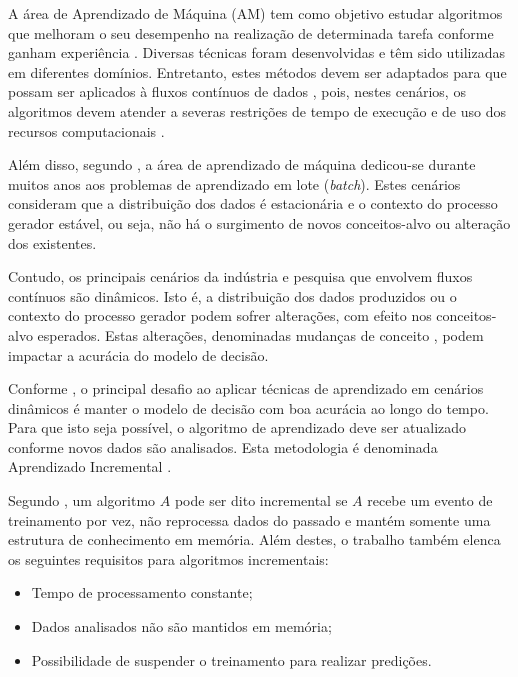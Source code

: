 \documentclass[qual, classic, a4paper]{ufbathesis}
\begin{document}
A área de Aprendizado de Máquina (AM) tem como objetivo estudar algoritmos que melhoram o seu desempenho na realização de determinada tarefa conforme ganham experiência \cite{Mitchell:1997:ML:541177}.
Diversas técnicas foram desenvolvidas e têm sido utilizadas em diferentes domínios.
Entretanto, estes métodos devem ser adaptados para que possam ser aplicados à fluxos contínuos de dados \cite{Aggarwal:2006:DSM:1196418},
pois, nestes cenários, os algoritmos devem atender a severas restrições de tempo de execução e de uso dos recursos computacionais \cite{Bifet:2009:ALM:1656274.1656287}.

Além disso, segundo \cite{Gama:2010:KDD:1855075}, a área de aprendizado de máquina dedicou-se durante muitos anos aos problemas de aprendizado em lote (\textit{batch}).
Estes cenários consideram que a distribuição dos dados é estacionária e o contexto do processo gerador estável, 
ou seja, 
não há o surgimento de novos conceitos-alvo ou alteração dos existentes.

Contudo, os principais cenários da indústria e pesquisa que envolvem fluxos contínuos são dinâmicos.
Isto é, a distribuição dos dados produzidos ou o contexto do processo gerador podem sofrer alterações, com efeito nos conceitos-alvo esperados.
Estas alterações, denominadas mudanças de conceito \cite{Gama:2010:KDD:1855075}, podem impactar a acurácia do modelo de decisão.

Conforme \cite{Gama:Rodrigues:2009}, o principal desafio ao aplicar técnicas de aprendizado em cenários dinâmicos é manter o modelo de decisão com boa acurácia ao longo do tempo.
Para que isto seja possível, o algoritmo de aprendizado deve ser atualizado conforme novos dados são analisados.
Esta metodologia é denominada Aprendizado Incremental \cite{Gama:2014:SCD:2597757.2523813}.

Segundo \cite{Langley:reimann1995learning}, um algoritmo $A$ pode ser dito incremental se $A$ recebe um evento de treinamento por vez,
não reprocessa dados do passado e mantém somente uma estrutura de conhecimento em memória. 
Além destes, o trabalho também elenca os seguintes requisitos para algoritmos incrementais:

\begin{itemize}
    \item Tempo de processamento constante;
    \item Dados analisados não são mantidos em memória;
    \item Possibilidade de suspender o treinamento para realizar predições.
\end{itemize}
\end{document}
